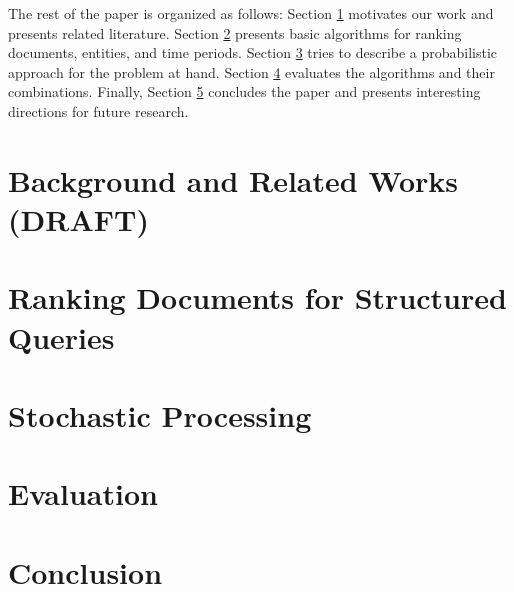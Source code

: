 \documentclass{libtex/llncs}
\newcommand{\new}[1]{{\color{blue}#1}}
\begin{document}
The rest of the paper is organized as follows:
Section \ref{sec:motivAndRW} motivates our work and presents related literature.
Section \ref{sec:queryingSemLayer} presents \new{basic} algorithms for ranking documents, entities, and time periods.
\new{Section \ref{sec:pagerank} tries to describe a probabilistic approach for the problem at hand.}
Section \ref{sec:eval} evaluates the algorithms and their combinations.
Finally, Section \ref{sec:concl} concludes the paper and
presents interesting directions for future research.





\section{Background and Related Works (DRAFT)}
\label{sec:motivAndRW}




\section{Ranking Documents for Structured Queries}
\label{sec:queryingSemLayer}




\section{Stochastic Processing}
\label{sec:pagerank}




\section{Evaluation}
\label{sec:eval}





\section{Conclusion}
\label{sec:concl}
\end{document}
